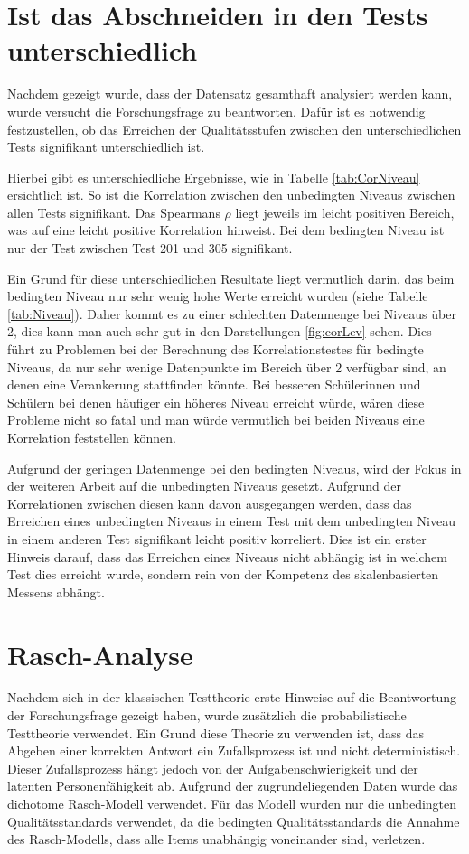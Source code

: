 \section{Ist das Abschneiden in den Tests unterschiedlich}

Nachdem gezeigt wurde, dass der Datensatz gesamthaft analysiert werden kann, wurde versucht die Forschungsfrage zu beantworten. Dafür ist es notwendig festzustellen, ob das Erreichen der Qualitätsstufen zwischen den unterschiedlichen Tests signifikant unterschiedlich ist.

Hierbei gibt es unterschiedliche Ergebnisse, wie in Tabelle \ref{tab:CorNiveau} ersichtlich ist. So ist die Korrelation zwischen den unbedingten Niveaus zwischen allen Tests signifikant. Das Spearmans $\rho$ liegt jeweils im leicht positiven Bereich, was auf eine leicht positive Korrelation hinweist. Bei dem bedingten Niveau ist nur der Test zwischen Test 201 und 305 signifikant.

Ein Grund für diese unterschiedlichen Resultate liegt vermutlich darin, das beim bedingten Niveau nur sehr wenig hohe Werte erreicht wurden (siehe Tabelle \ref{tab:Niveau}). Daher kommt es zu einer schlechten Datenmenge bei Niveaus über 2, dies kann man auch sehr gut in den Darstellungen \ref{fig:corLev} sehen. Dies führt zu Problemen bei der Berechnung des Korrelationstestes für bedingte Niveaus, da nur sehr wenige Datenpunkte im Bereich über 2 verfügbar sind, an denen eine Verankerung stattfinden könnte. Bei besseren Schülerinnen und Schülern bei denen häufiger ein höheres Niveau erreicht würde, wären diese Probleme nicht so fatal und man würde vermutlich bei beiden Niveaus eine Korrelation feststellen können.

Aufgrund der geringen Datenmenge bei den bedingten Niveaus, wird der Fokus in der weiteren Arbeit auf die unbedingten Niveaus gesetzt. Aufgrund der Korrelationen zwischen diesen kann davon ausgegangen werden, dass das Erreichen eines unbedingten Niveaus in einem Test mit dem unbedingten Niveau in einem anderen Test signifikant leicht positiv korreliert. Dies ist ein erster Hinweis darauf, dass das Erreichen eines Niveaus nicht abhängig ist in welchem Test dies erreicht wurde, sondern rein von der Kompetenz des skalenbasierten Messens abhängt. 

\section{Rasch-Analyse}

Nachdem sich in der klassischen Testtheorie erste Hinweise auf die Beantwortung der Forschungsfrage gezeigt haben, wurde zusätzlich die probabilistische Testtheorie verwendet. Ein Grund diese Theorie zu verwenden ist, dass das Abgeben einer korrekten Antwort ein Zufallsprozess ist und nicht deterministisch. Dieser Zufallsprozess hängt jedoch von der Aufgabenschwierigkeit und der latenten Personenfähigkeit ab. Aufgrund der zugrundeliegenden Daten wurde das dichotome Rasch-Modell verwendet. Für das Modell wurden nur die unbedingten Qualitätsstandards verwendet, da die bedingten Qualitätsstandards die Annahme des Rasch-Modells, dass alle Items unabhängig voneinander sind, verletzen.

